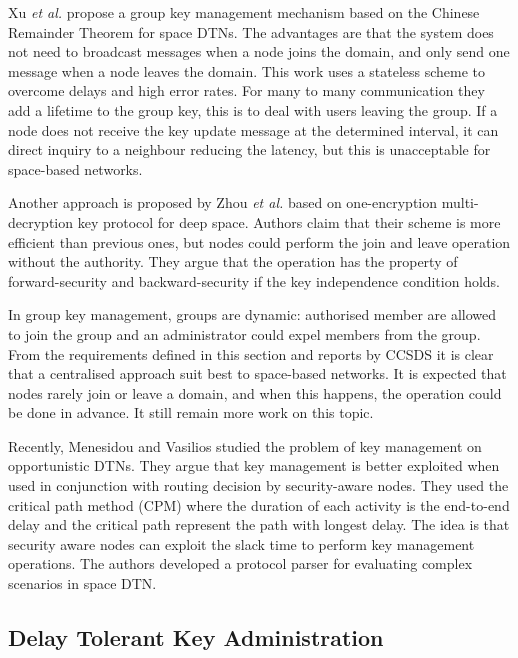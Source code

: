Xu \textit{et al.} \cite{xu2012chinese} propose a group key management mechanism based on the Chinese Remainder Theorem for space DTNs. The advantages are that the system does not need to broadcast messages when a node joins the domain, and only send one message when a node leaves the domain. This work uses a stateless scheme to overcome delays and high error rates. For many to many communication they add a lifetime to the group key, this is to deal with users leaving the group.  If a node does not receive the key update message at the determined interval, it can direct inquiry to a neighbour reducing the latency, but this is unacceptable for space-based networks.

Another approach is proposed by Zhou \textit{et al.} \cite{zhou2014autonomic} based on one-encryption multi-decryption key protocol for deep space. Authors claim that their scheme is more efficient than previous ones, but nodes could perform the join and leave operation without the authority. They argue that the operation has the property of forward-security and backward-security if the key independence condition holds.

In group key management, groups are dynamic: authorised member are allowed to join the group and an administrator could expel members from the group. From the requirements defined in this section and reports by CCSDS \cite{standard2010ccsds,book2012architecture,book2006security} it is clear that a centralised approach suit best to space-based networks. It is expected that nodes rarely join or leave a domain, and when this happens, the operation could be done in advance. It still remain more work on this topic. 

Recently, Menesidou and Vasilios \cite{menesidou2016automated} studied the problem of key management on opportunistic DTNs. They argue that key management is better exploited when used in conjunction with routing decision by security-aware nodes. They used the critical path method (CPM) where the duration of each activity is the end-to-end delay and the critical path represent the path with longest delay. The idea is that security aware nodes can exploit the slack time to perform key management operations. The authors developed a protocol parser for evaluating complex scenarios in space DTN.




\subsection{Delay Tolerant Key Administration}

